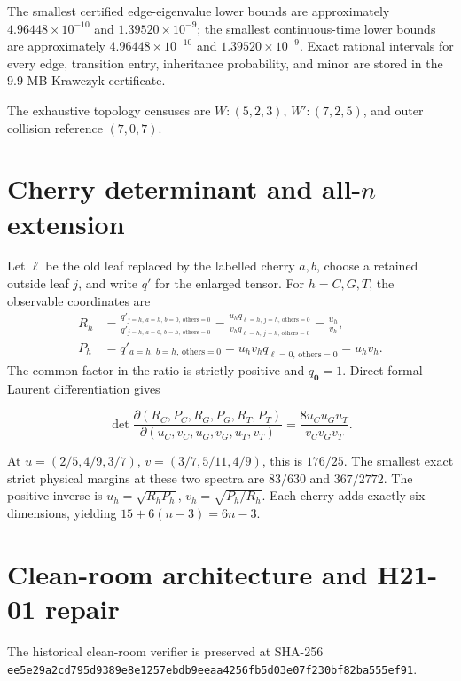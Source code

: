 \documentclass[10pt]{article}
\newcommand{\sha}[1]{\nolinkurl{#1}}
\begin{document}
The smallest certified edge-eigenvalue lower bounds are approximately
\(4.96448\times10^{-10}\) and \(1.39520\times10^{-9}\); the smallest
continuous-time lower bounds are approximately
\(4.96448\times10^{-10}\) and \(1.39520\times10^{-9}\).  Exact rational
intervals for every edge, transition entry, inheritance probability, and
minor are stored in the 9.9 MB Krawczyk certificate.

The exhaustive topology censuses are
\(W:(5,2,3)\), \(W':(7,2,5)\), and outer collision reference \((7,0,7)\).

\section{Cherry determinant and all-\texorpdfstring{\(n\)}{n} extension}

Let \(\ell\) be the old leaf replaced by the labelled cherry \(a,b\), choose
a retained outside leaf \(j\), and write \(q'\) for the enlarged tensor.  For
\(h=C,G,T\), the observable coordinates are
\[
\begin{aligned}
R_h&=
\frac{q'_{j=h,\,a=h,\,b=0,\,\mathrm{others}=0}}
     {q'_{j=h,\,a=0,\,b=h,\,\mathrm{others}=0}}
=\frac{u_hq_{\ell=h,\,j=h,\,\mathrm{others}=0}}
       {v_hq_{\ell=h,\,j=h,\,\mathrm{others}=0}}
=\frac{u_h}{v_h},\\
P_h&=q'_{a=h,\,b=h,\,\mathrm{others}=0}
=u_hv_hq_{\ell=0,\,\mathrm{others}=0}=u_hv_h.
\end{aligned}
\]
The common factor in the ratio is strictly positive and
\(q_{\mathbf0}=1\).  Direct formal Laurent differentiation gives

\[
\det\frac{\partial(R_C,P_C,R_G,P_G,R_T,P_T)}
{\partial(u_C,v_C,u_G,v_G,u_T,v_T)}
=\frac{8u_Cu_Gu_T}{v_Cv_Gv_T}.
\]

At \(u=(2/5,4/9,3/7)\), \(v=(3/7,5/11,4/9)\), this is \(176/25\).
The smallest exact strict physical margins at these two spectra are
\(83/630\) and \(367/2772\).  The positive inverse is
\(u_h=\sqrt{R_hP_h}\), \(v_h=\sqrt{P_h/R_h}\).  Each cherry adds exactly six
dimensions, yielding \(15+6(n-3)=6n-3\).

\section{Clean-room architecture and H21-01 repair}

The historical clean-room verifier is preserved at SHA-256
\sha{ee5e29a2cd795d9389e8e1257ebdb9eeaa4256fb5d03e07f230bf82ba555ef91}.
\end{document}
